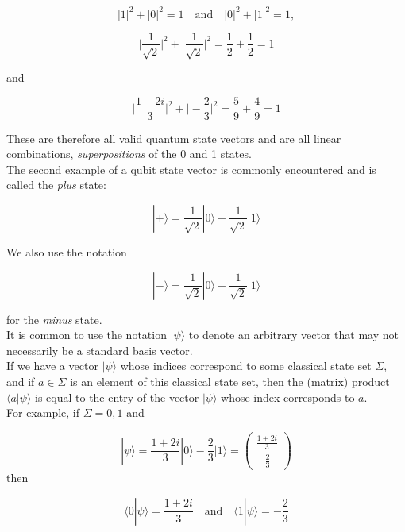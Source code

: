 \documentclass[svgnames]{article}     %
\begin{document}
\[
|1|^2 + |0|^2 = 1 \quad \text{and}  \quad |0|^2 + |1|^2 = 1, 
\] \vspace{5px}

\[
  \Big| \frac{1}{\sqrt{2}} \Big|^2 + \Big| \frac{1}{\sqrt{2}}\Big|^2
  = \frac{1}{2} + \frac{1}{2} = 1
\] \vspace{5px}

and 

\[
\Big| \frac{1+2i}{3} \Big|^2 + \Big| -\frac{2}{3}\Big|^2 = \frac{5}{9}
+ \frac{4}{9} = 1
\] \vspace{5px}

These are therefore all valid quantum state vectors and are all linear
combinations, \textit{superpositions} of the 0 and 1 states. \\

The second example of a qubit state vector is commonly encountered and is
called the \textit{plus} state: 

\[
  |+\rangle = \frac{1}{\sqrt{2}}|0\rangle + \frac{1}{\sqrt{2}} |1\rangle
\] \vspace{5px}

We also use the notation 

\[
  |-\rangle = \frac{1}{\sqrt{2}}|0\rangle - \frac{1}{\sqrt{2}}|1\rangle
\] \vspace{5px}

for the \textit{minus} state. \\ 

It is common to use the notation $|\psi\rangle$ to denote an arbitrary vector
that may not necessarily be a standard basis vector. \\

If we have a vector $|\psi\rangle$ whose indices correspond to some classical
state set $\Sigma$, and if $a \in \Sigma$ is an element of this classical state
set, then the (matrix) product $\langle a | \psi \rangle $ is equal to the
entry of the vector  $|\psi\rangle$ whose index corresponds to $a$. \\ 

For example, if  $\Sigma = {0, 1}$ and 

\[
|\psi\rangle = \frac{1+2i}{3}|0\rangle - \frac{2}{3}|1\rangle = \begin{pmatrix}
  \frac{1+2i}{3}\\[4px] -\frac{2}{3}
\end{pmatrix} 
\] \vspace{5px}
then 

\[
\langle 0 | \psi \rangle = \frac{1+2i}{3} \quad \text{and}  \quad \langle
1 | \psi \rangle = -\frac{2}{3}
\] \vspace{5px}
\end{document}

